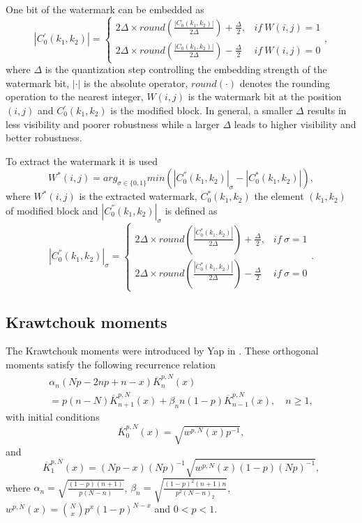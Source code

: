 \documentclass[runningheads]{llncs}
\begin{document}
One bit of the watermark can be embedded as
\begin{equation}
|C{}_{0}^{'}(k_{1},k_{2})|=\begin{cases}
2\Delta\times round(\frac{|C{}_{0}(k_{1},k_{2})|}{2\Delta})+\frac{\Delta}{2}, & if\:W(i,j)=1\\
2\Delta\times round(\frac{|C{}_{0}(k_{1},k_{2})|}{2\Delta})-\frac{\Delta}{2} & if\:W(i,j)=0
\end{cases},
\label{DMEm}
\end{equation}
where $\Delta$ is the quantization step controlling the embedding strength of the watermark bit, $|\cdot|$ is the absolute operator, $round(\cdot)$ denotes the rounding operation to the nearest integer, $W(i,j)$ is the watermark bit at the position $(i,j)$ and $C{}_{0}^{'}(k_{1},k_{2})$ is the modified block. In general, a smaller $\Delta$ results in less visibility and poorer robustness while a larger $\Delta$ leads to higher visibility and better robustness.

To extract the watermark it is used
\begin{equation}
W^{*}(i,j)=arg_{\sigma\in\{0,1\}}min(|C_{0}^{''}(k_{1},k_{2})|_{\sigma}-|C_{0}^{*}(k_{1},k_{2})|)
\label{DMEx},
\end{equation}
where $W^{*}(i,j)$ is the extracted watermark, $C_{0}^{*}(k_{1},k_{2})$ the element $(k_1, k_2)$ of modified block and $|C_{0}^{''}(k_{1},k_{2})|_{\sigma}$ is defined as
\begin{equation}
|C_{0}^{''}(k_{1},k_{2})|_{\sigma}=\begin{cases}
2\Delta\times round(\frac{|C_{0}^{*}(k_{1},k_{2})|}{2\Delta})+\frac{\Delta}{2}, & if\:\sigma=1\\
2\Delta\times round(\frac{|C_{0}^{*}(k_{1},k_{2})|}{2\Delta})-\frac{\Delta}{2} & if\:\sigma=0
\end{cases}.
\end{equation}

\subsection{Krawtchouk moments}
The Krawtchouk moments were introduced by Yap in \cite{Yap2003}. These orthogonal moments satisfy the following recurrence relation
\begin{multline*}
\alpha_n(Np-2np+n-x)\overline{K}_{n}^{p,N}(x) \\= p(n-N)\overline{K}_{n+1}^{p,N}(x)+\beta_n n(1-p)\overline{K}_{n-1}^{p,N}(x),\quad n\geq 1,
\end{multline*}
with initial conditions 
\begin{equation*}
\overline{K}_{0}^{p,N}(x) = \sqrt{w^{p,N}(x)p^{-1}},
\end{equation*}	
and
\begin{equation*}
\overline{K}_{1}^{p,N}(x) = (Np-x)(Np)^{-1}\sqrt{w^{p,N}(x)(1-p)(Np)^{-1}},
\end{equation*}
where $\alpha_n = \sqrt{\frac{(1-p)(n+1)}{p(N-n)}}$, $\beta_n = \sqrt{\frac{(1-p)^2(n+1)n}{p^2(N-n)_2}}$, $w^{p,N}(x) = \binom{N}{x}p^x(1-p)^{N-x}$ and $0<p<1$.
\end{document}
